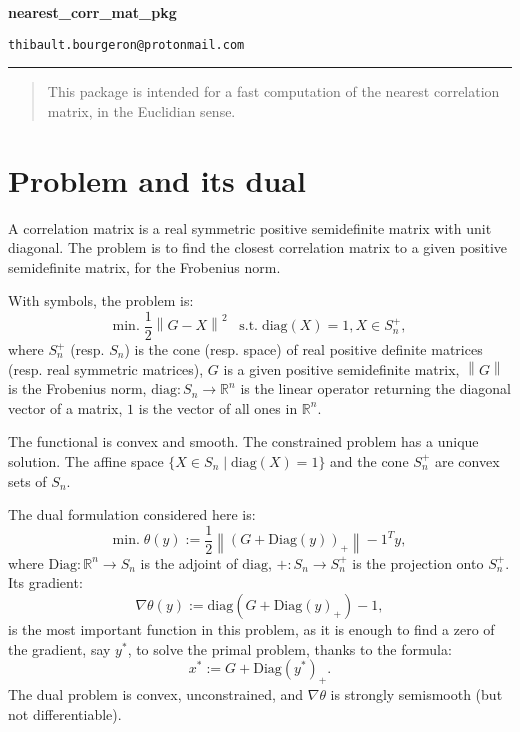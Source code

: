 \documentclass{article}
\newcommand{\norm}[1]{\left\lVert#1\right\rVert}
\newcommand{\R}{\mathbb{R}}
\begin{document}
\begin{center}
{\LARGE \textbf{nearest\_corr\_mat\_pkg}}
\end{center}

\setlength\parindent{0pt}

\begin{center}
\texttt{thibault.bourgeron@protonmail.com}
\end{center}

\noindent\rule{\textwidth}{0.1pt}


\begin{abstract}
This package is intended for a fast computation of the nearest correlation matrix, in the Euclidian sense.
\end{abstract}

\section{Problem and its dual}

A correlation matrix is a real symmetric positive semidefinite matrix with unit diagonal.
The problem is to find the closest correlation matrix to a given positive semidefinite matrix, for the Frobenius norm.

\medskip

With symbols, the problem is:
\[ \textrm{min.} \; \frac12 \norm{G - X}^2 \;\;\; \text{s.t.} \; \mathrm{diag}(X) = 1, X \in S_n^+, \]
where $S_n^+$ (resp. $S_n$) is the cone (resp. space) of real positive definite matrices (resp. real symmetric matrices), $G$ is a given positive semidefinite matrix, $\norm{G}$ is the Frobenius norm, $\mathrm{diag}: S_n \to \R^n$ is the linear operator returning the diagonal vector of a matrix, $1$ is the vector of all ones in $\R^n$.

\medskip

The functional is convex and smooth. The constrained problem has a unique solution. The affine space $\{X\in S_n \mid \mathrm{diag}(X) = 1\}$ and the cone $S_n^+$ are convex sets of $S_n$.

\bigskip

The dual formulation considered here is:
\[\textrm{min.} \; \theta(y) := \frac12 \norm{(G + \mathrm{Diag}(y))_+} - 1^T y, \]
where $\mathrm{Diag}: \R^n \to S_n$ is the adjoint of $\mathrm{diag}$, $+: S_n \to S_n^+$ is the projection onto $S_n^+$.
Its gradient:
\[
\nabla \theta(y) := \mathrm{diag}(G + \mathrm{Diag}(y)_+) - 1,
\]
is the most important function in this problem, as it is enough to find a zero of the gradient, say $y^*$, to solve the primal problem, thanks to the formula:
\[ x^* := G + \mathrm{Diag}(y^*)_+. \]
The dual problem is convex, unconstrained, and $\nabla \theta$ is strongly semismooth (but not differentiable).
\end{document}
